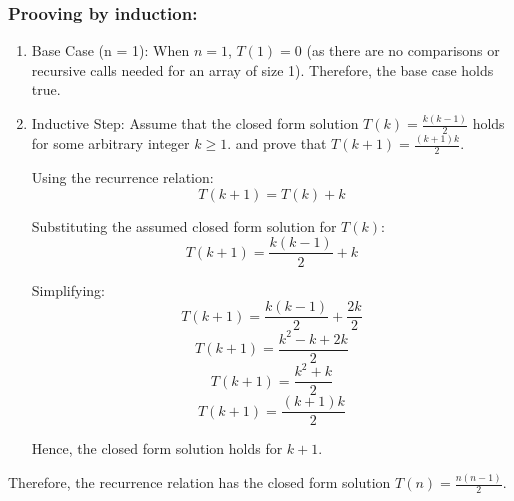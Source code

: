 \documentclass{article}
\begin{document}
\subsubsection*{Prooving by induction:}
\begin{enumerate}
    \item Base Case (n = 1):
          When \( n = 1 \), \( T(1) = 0 \) (as there are no comparisons or recursive calls needed for an array of size 1).
          Therefore, the base case holds true.

    \item Inductive Step:
          Assume that the closed form solution \( T(k) = \frac{k(k-1)}{2} \) holds for some arbitrary integer \( k \geq 1 \).
          and prove that \( T(k+1) = \frac{(k+1)k}{2} \).

          Using the recurrence relation:
          \[ T(k+1) = T(k) + k \]

          Substituting the assumed closed form solution for \( T(k) \):
          \[ T(k+1) = \frac{k(k-1)}{2} + k \]

          Simplifying:
          \[ T(k+1) = \frac{k(k-1)}{2} + \frac{2k}{2} \]
          \[ T(k+1) = \frac{k^2 - k + 2k}{2} \]
          \[ T(k+1) = \frac{k^2 + k}{2} \]
          \[ T(k+1) = \frac{(k+1)k}{2} \]

          Hence, the closed form solution holds for \( k+1 \).

\end{enumerate}
Therefore, the recurrence relation has the closed form solution \( T(n) = \frac{n(n-1)}{2} \).
\newpage
\end{document}
